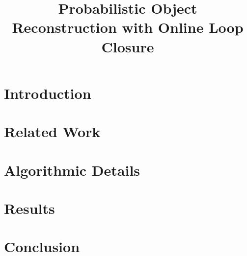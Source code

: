 \documentclass{bmvc2k}
\title{Probabilistic Object Reconstruction with Online Loop Closure}
\begin{document}
\maketitle

\begin{abstract}

\end{abstract}

\vspace{-\baselineskip}

\section{Introduction}
\label{sec:introduction}


\vspace{-\baselineskip}

\section{Related Work}
\label{sec:lit_review}


\vspace{-\baselineskip}

\section{Algorithmic Details}



\section{Results}
\label{sec:results}


\vspace{-\baselineskip}

\section{Conclusion}
\label{sec:discussion}



\end{document}
